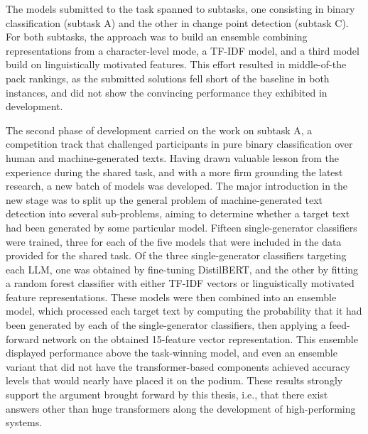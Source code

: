 The models submitted to the task spanned to subtasks, one consisting in binary classification (subtask A) and the other in change point detection (subtask C).
For both subtasks, the approach was to build an ensemble combining representations from a character-level mode, a TF-IDF model, and a third model build on linguistically motivated features.
This effort resulted in middle-of-the pack rankings, as the submitted solutions fell short of the baseline in both instances, and did not show the convincing performance they exhibited in development.

The second phase of development carried on the work on subtask A, a competition track that challenged participants in pure binary classification over human and machine-generated texts.
Having drawn valuable lesson from the experience during the shared task, and with a more firm grounding the latest research, a new batch of models was developed.
The major introduction in the new stage was to split up the general problem of machine-generated text detection into several sub-problems, aiming to determine whether a target text had been generated by some particular model.
Fifteen single-generator classifiers were trained, three for each of the five models that were included in the data provided for the shared task.
Of the three single-generator classifiers targeting each LLM, one was obtained by fine-tuning DistilBERT, and the other by fitting a random forest classifier with either TF-IDF vectors or linguistically motivated feature representations.
These models were then combined into an ensemble model, which processed each target text by computing the probability that it had been generated by each of the single-generator classifiers, then applying a feed-forward network on the obtained 15-feature vector representation.
This ensemble displayed performance above the task-winning model, and even an ensemble variant that did not have the transformer-based components achieved accuracy levels that would nearly have placed it on the podium.
These results strongly support the argument brought forward by this thesis, i.e., that there exist answers other than huge transformers along the development of high-performing systems.

